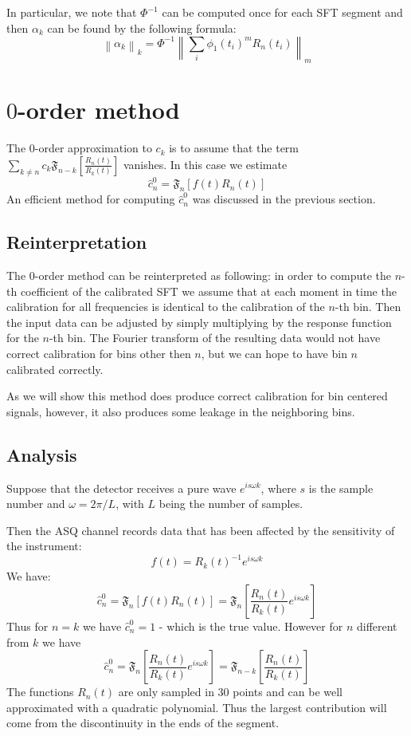 \documentclass[12pt]{article}
\def\FTC#1#2{{\mathfrak F}_{#1}\left[#2\right]}
\begin{document}
In particular, we note that $\Phi^{-1}$ can be computed once for each SFT segment
and then $\alpha_k$ can be found by the following formula:
$$
\left\|\alpha_k\right\|_k=\Phi^{-1}\left\|\sum_i\phi_1(t_i)^mR_n(t_i)\right\|_m
$$


\section{$0$-order method}
The $0$-order approximation to $c_k$ is to assume that the term $\sum_{k\neq n} c_k \FTC{n-k}{\frac{R_n(t)}{R_k(t)}}$
vanishes. In this case we estimate
$$
\hat{c}^0_n=\FTC{n}{f(t)R_n(t)}
$$
An efficient method for computing $\hat{c}^0_n$ was discussed in the previous section.
\subsection{Reinterpretation}
The $0$-order method can be reinterpreted as following: in order to compute the
$n$-th coefficient of the calibrated SFT we assume that at each moment in time
the calibration for all frequencies is identical to the calibration of the $n$-th
bin. Then the input data can be adjusted by simply multiplying by the response
function for the $n$-th bin. The Fourier transform of the resulting data would not
have correct calibration for bins other then $n$, but we can hope to have bin $n$
calibrated correctly.

As we will show this method does produce correct calibration for bin centered
signals, however, it also produces some leakage in the neighboring bins.

\subsection{Analysis}
Suppose that the detector receives a pure wave $e^{is\omega k}$, where $s$ is the
sample number and $\omega=2\pi/L$, with $L$ being the number of samples.

Then the ASQ channel records data that has been affected by the sensitivity 
of the instrument:
$$
f(t)=R_k(t)^{-1}e^{is\omega k}
$$
We have:
$$
\hat{c}^0_n=\FTC{n}{f(t)R_n(t)}=\FTC{n}{\frac{R_n(t)}{R_k(t)}e^{is\omega k}}
$$
Thus for $n=k$ we have $\hat{c}^0_n=1$ - which is the true value. 
However for $n$ different from $k$ we have
$$
\hat{c}^0_n=\FTC{n}{\frac{R_n(t)}{R_k(t)}e^{is\omega k}}=\FTC{n-k}{\frac{R_n(t)}{R_k(t)}}
$$
The functions $R_n(t)$ are only sampled in 30 points and can be well approximated
with a quadratic polynomial. Thus the largest contribution will come from the
discontinuity in the ends of the segment. 
\end{document}
